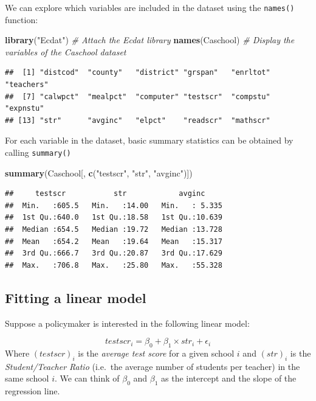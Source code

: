 \documentclass[]{book}
\newenvironment{Shaded}{\begin{snugshade}}{\end{snugshade}}
\newcommand{\KeywordTok}[1]{\textcolor[rgb]{0.13,0.29,0.53}{\textbf{#1}}}
\newcommand{\StringTok}[1]{\textcolor[rgb]{0.31,0.60,0.02}{#1}}
\newcommand{\CommentTok}[1]{\textcolor[rgb]{0.56,0.35,0.01}{\textit{#1}}}
\newcommand{\NormalTok}[1]{#1}
\theoremstyle{definition}
\theoremstyle{definition}
\theoremstyle{definition}
\theoremstyle{remark}
\begin{document}
We can explore which variables are included in the dataset using the
\texttt{names()} function:

\begin{Shaded}
\begin{Highlighting}[]
\KeywordTok{library}\NormalTok{(}\StringTok{"Ecdat"}\NormalTok{) }\CommentTok{# Attach the Ecdat library}
\KeywordTok{names}\NormalTok{(Caschool) }\CommentTok{# Display the variables of the Caschool dataset}
\end{Highlighting}
\end{Shaded}

\begin{verbatim}
##  [1] "distcod"  "county"   "district" "grspan"   "enrltot"  "teachers"
##  [7] "calwpct"  "mealpct"  "computer" "testscr"  "compstu"  "expnstu" 
## [13] "str"      "avginc"   "elpct"    "readscr"  "mathscr"
\end{verbatim}

For each variable in the dataset, basic summary statistics can be
obtained by calling \texttt{summary()}

\begin{Shaded}
\begin{Highlighting}[]
\KeywordTok{summary}\NormalTok{(Caschool[, }\KeywordTok{c}\NormalTok{(}\StringTok{"testscr"}\NormalTok{, }\StringTok{"str"}\NormalTok{, }\StringTok{"avginc"}\NormalTok{)])}
\end{Highlighting}
\end{Shaded}

\begin{verbatim}
##     testscr           str            avginc      
##  Min.   :605.5   Min.   :14.00   Min.   : 5.335  
##  1st Qu.:640.0   1st Qu.:18.58   1st Qu.:10.639  
##  Median :654.5   Median :19.72   Median :13.728  
##  Mean   :654.2   Mean   :19.64   Mean   :15.317  
##  3rd Qu.:666.7   3rd Qu.:20.87   3rd Qu.:17.629  
##  Max.   :706.8   Max.   :25.80   Max.   :55.328
\end{verbatim}

\subsection{Fitting a linear model}\label{fitting-a-linear-model}

Suppose a policymaker is interested in the following linear model:

\[testscr_i = \beta_0 + \beta_1 \times str_i + \epsilon_i\] Where
\((testscr)_i\) is the \emph{average test score} for a given school
\(i\) and \((str)_i\) is the \emph{Student/Teacher Ratio} (i.e.~the
average number of students per teacher) in the same school \(i\). We can
think of \(\beta_0\) and \(\beta_1\) as the intercept and the slope of
the regression line.
\end{document}
